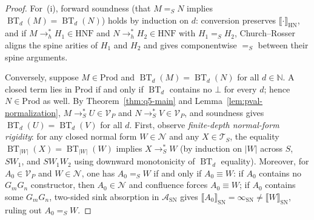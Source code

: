 \documentclass[11pt,reqno]{amsart}
\numberwithin{equation}{section}
\theoremstyle{plain}
\theoremstyle{definition}
\theoremstyle{remark}
\DeclareMathOperator{\BT}{BT}
\newcommand{\TS}{\mathcal{T}_S}
\newcommand{\HNF}{\mathrm{HNF}}
\newcommand{\SN}{\mathrm{SN}}
\newcommand{\HN}{\mathrm{HN}}
\newcommand{\Prod}{\mathrm{Prod}}
\newcommand{\sem}[1]{\llbracket #1 \rrbracket}
\newcommand{\redSs}{\to_S^*}
\newcommand{\convS}{=_S}
\begin{document}
\begin{proof}
For~(i), forward soundness (that $M \convS N$ implies $\BT_d(M) = \BT_d(N)$) holds by induction on $d$: conversion preserves $\sem{\cdot}_{\HN}$, and if $M \to_h^* H_1 \in \HNF$ and $N \to_h^* H_2 \in \HNF$ with $H_1 \convS H_2$, Church--Rosser aligns the spine arities of $H_1$ and $H_2$ and gives componentwise $\convS$ between their spine arguments.

Conversely, suppose $M \in \Prod$ and $\BT_d(M) = \BT_d(N)$ for all $d \in \mathbb{N}$. A closed term lies in $\Prod$ if and only if $\BT_d$ contains no $\bot$ for every $d$; hence $N \in \Prod$ as well. By Theorem~\ref{thm:q5-main} and Lemma~\ref{lem:pval-normalization}, $M \redSs U \in \mathcal{V}_P$ and $N \redSs V \in \mathcal{V}_P$, and soundness gives $\BT_d(U) = \BT_d(V)$ for all $d$. First, observe \emph{finite-depth normal-form rigidity}: for any closed normal form $W \in \mathcal{N}$ and any $X \in \TS$, the equality $\BT_{|W|}(X) = \BT_{|W|}(W)$ implies $X \redSs W$ (by induction on $|W|$ across $S$, $S W_1$, and $S W_1 W_2$ using downward monotonicity of $\BT_d$ equality). Moreover, for $A_0 \in \mathcal{V}_P$ and $W \in \mathcal{N}$, one has $A_0 \convS W$ if and only if $A_0 \equiv W$: if $A_0$ contains no $G_m G_n$ constructor, then $A_0 \in \mathcal{N}$ and confluence forces $A_0 \equiv W$; if $A_0$ contains some $G_m G_n$, two-sided sink absorption in $\mathcal{A}_{\SN}$ gives $\sem{A_0}_{\SN} = \infty_{\SN} \neq \sem{W}_{\SN}$, ruling out $A_0 \convS W$.


\end{proof}
\end{document}
